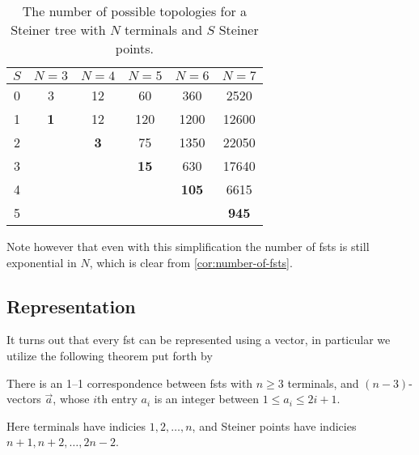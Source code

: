 \begin{table}[htbp]
  \centering
  \begin{tabular}{cccccc}
    \toprule
    $S$ & $N = 3$    & $N = 4$    & $N = 5$     & $N = 6$      & $N = 7$      \\
    \midrule
    0   & 3          & 12         & 60          & 360          & 2520         \\
    1   & \textbf{1} & 12         & 120         & 1200         & 12600        \\
    2   &            & \textbf{3} & 75          & 1350         & 22050        \\
    3   &            &            & \textbf{15} & 630          & 17640        \\
    4   &            &            &             & \textbf{105} & 6615         \\
    5   &            &            &             &              & \textbf{945} \\
    \bottomrule
  \end{tabular}
  \caption[Number of possible topologies]{The number of possible topologies for a Steiner tree with $N$
    terminals and $S$ Steiner points.\label{tab:number-of-topologies}}
\end{table}

Note however that even with this simplification the number of \acp{fst} is
still exponential in $N$, which is clear from \cref{cor:number-of-fsts}.

\subsection{Representation}
\label{sec:representation}

It turns out that every \ac{fst} can be represented using a vector, in
particular we utilize the following theorem put forth by \textcite{smith1992}

\begin{theorem}
  There is an 1--1 correspondence between \acp{fst} with $n \ge 3$ terminals,
  and $(n-3)$-vectors $\vec{a}$, whose $i$th entry $a_i$ is an integer between
  $1 \le a_i \le 2 i + 1$.
\end{theorem}

Here terminals have indicies $1, 2, \ldots, n$, and Steiner points have indicies
$n + 1, n + 2, \ldots, 2 n - 2$.

